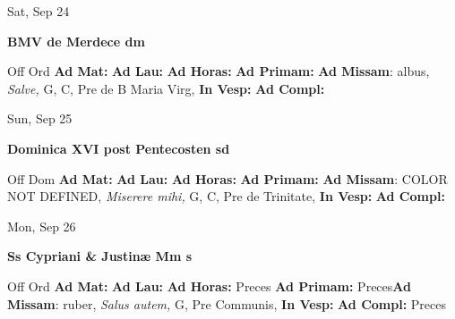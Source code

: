 \documentclass[10pt]{memoir}
\begin{document}
\begin{center}
\begin{minipage}{3.5in}
\vspace{2em}
\begin{center}Sat, Sep 24
\end{center}
\textbf{ \large BMV de Merdece
\textnormal{\normalsize dm}}

\begin{justify}Off Ord
\textbf{Ad Mat: }
\textbf{Ad Lau: }
\textbf{Ad Horas: }
\textbf{Ad Primam: }\textbf{Ad Missam}: albus, \textit{Salve,} G, C, Pre de B Maria Virg, 
\textbf{In Vesp: }
\textbf{Ad Compl: }
\end{justify}
\end{minipage}
\end{center}

\begin{center}
\begin{minipage}{3.5in}
\vspace{2em}
\begin{center}Sun, Sep 25
\end{center}
\textbf{ \large Dominica XVI post Pentecosten
\textnormal{\normalsize sd}}

\begin{justify}Off Dom
\textbf{Ad Mat: }
\textbf{Ad Lau: }
\textbf{Ad Horas: }
\textbf{Ad Primam: }\textbf{Ad Missam}: COLOR NOT DEFINED, \textit{Miserere mihi,} G, C, Pre de Trinitate, 
\textbf{In Vesp: }
\textbf{Ad Compl: }
\end{justify}
\end{minipage}
\end{center}

\begin{center}
\begin{minipage}{3.5in}
\vspace{2em}
\begin{center}Mon, Sep 26
\end{center}
\textbf{ \large Ss Cypriani \& Justinæ Mm
\textnormal{\normalsize s}}

\begin{justify}Off Ord
\textbf{Ad Mat: }
\textbf{Ad Lau: }
\textbf{Ad Horas: }Preces
\textbf{Ad Primam: }Preces\textbf{Ad Missam}: ruber, \textit{Salus autem,} G, Pre Communis, 
\textbf{In Vesp: }
\textbf{Ad Compl: }Preces
\end{justify}
\end{minipage}
\end{center}
\end{document}
